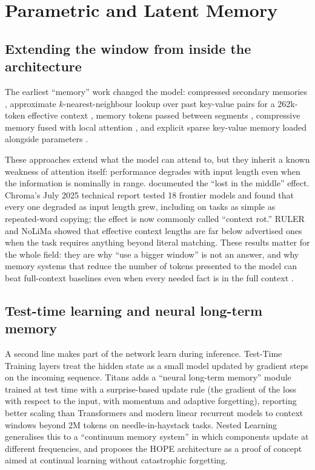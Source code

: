 \documentclass[11pt]{article}
\begin{document}
\section{Parametric and Latent Memory}
\label{sec:parametric}

\subsection{Extending the window from inside the architecture}

The earliest ``memory'' work changed the model: compressed secondary memories \citep{rae2019compressive}, approximate $k$-nearest-neighbour lookup over past key-value pairs for a 262k-token effective context \citep{wu2022memorizing}, memory tokens passed between segments \citep{bulatov2022rmt}, compressive memory fused with local attention \citep{munkhdalai2024infini}, and explicit sparse key-value memory loaded alongside parameters \citep{yang2024memory3}.

These approaches extend what the model can attend to, but they inherit a known weakness of attention itself: performance degrades with input length even when the information is nominally in range. \citet{liu2023lost} documented the ``lost in the middle'' effect. Chroma's July 2025 technical report \citep{hong2025contextrot} tested 18 frontier models and found that every one degraded as input length grew, including on tasks as simple as repeated-word copying; the effect is now commonly called ``context rot.'' RULER \citep{hsieh2024ruler} and NoLiMa \citep{modarressi2025nolima} showed that effective context lengths are far below advertised ones when the task requires anything beyond literal matching. These results matter for the whole field: they are why ``use a bigger window'' is not an answer, and why memory systems that reduce the number of tokens presented to the model can beat full-context baselines even when every needed fact is in the full context \citep{rasmussen2025zep,chhikara2025mem0}.

\subsection{Test-time learning and neural long-term memory}

A second line makes part of the network learn during inference. Test-Time Training layers \citep{sun2024ttt} treat the hidden state as a small model updated by gradient steps on the incoming sequence. Titans \citep{behrouz2024titans} adds a ``neural long-term memory'' module trained at test time with a surprise-based update rule (the gradient of the loss with respect to the input, with momentum and adaptive forgetting), reporting better scaling than Transformers and modern linear recurrent models to context windows beyond 2M tokens on needle-in-haystack tasks. Nested Learning \citep{behrouz2025nested} generalises this to a ``continuum memory system'' in which components update at different frequencies, and proposes the HOPE architecture as a proof of concept aimed at continual learning without catastrophic forgetting.
\end{document}
